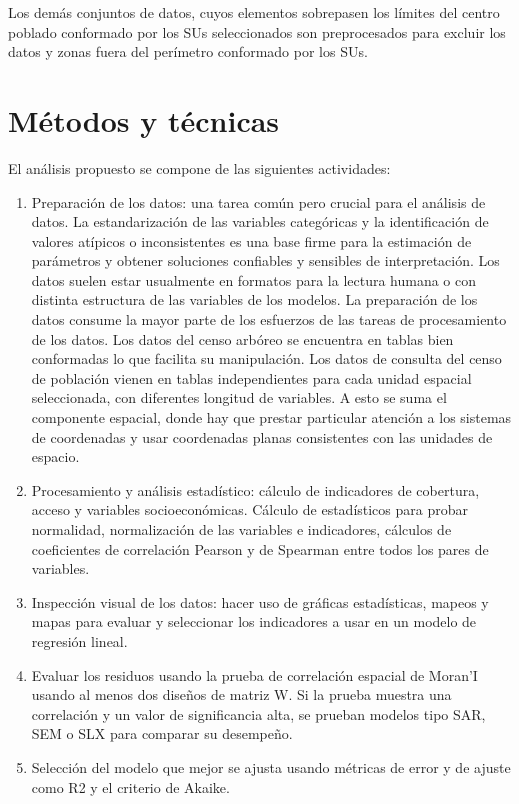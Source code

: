 \documentclass[12pt,]{book}
\providecommand{\tightlist}{%
  \setlength{\itemsep}{0pt}\setlength{\parskip}{0pt}}
\begin{document}
Los demás conjuntos de datos, cuyos elementos sobrepasen los límites del
centro poblado conformado por los SUs seleccionados son preprocesados
para excluir los datos y zonas fuera del perímetro conformado por los
SUs.

\section{Métodos y técnicas}\label{metodos-y-tecnicas}

El análisis propuesto se compone de las siguientes actividades:

\begin{enumerate}
\def\labelenumi{\arabic{enumi}.}
\tightlist
\item
  Preparación de los datos: una tarea común pero crucial para el
  análisis de datos. La estandarización de las variables categóricas y
  la identificación de valores atípicos o inconsistentes es una base
  firme para la estimación de parámetros y obtener soluciones confiables
  y sensibles de interpretación. Los datos suelen estar usualmente en
  formatos para la lectura humana o con distinta estructura de las
  variables de los modelos. La preparación de los datos consume la mayor
  parte de los esfuerzos de las tareas de procesamiento de los datos.
  Los datos del censo arbóreo se encuentra en tablas bien conformadas lo
  que facilita su manipulación. Los datos de consulta del censo de
  población vienen en tablas independientes para cada unidad espacial
  seleccionada, con diferentes longitud de variables. A esto se suma el
  componente espacial, donde hay que prestar particular atención a los
  sistemas de coordenadas y usar coordenadas planas consistentes con las
  unidades de espacio.
\item
  Procesamiento y análisis estadístico: cálculo de indicadores de
  cobertura, acceso y variables socioeconómicas. Cálculo de estadísticos
  para probar normalidad, normalización de las variables e indicadores,
  cálculos de coeficientes de correlación Pearson y de Spearman entre
  todos los pares de variables.
\item
  Inspección visual de los datos: hacer uso de gráficas estadísticas,
  mapeos y mapas para evaluar y seleccionar los indicadores a usar en un
  modelo de regresión lineal.
\item
  Evaluar los residuos usando la prueba de correlación espacial de
  Moran'I usando al menos dos diseños de matriz W. Si la prueba muestra
  una correlación y un valor de significancia alta, se prueban modelos
  tipo SAR, SEM o SLX para comparar su desempeño.
\item
  Selección del modelo que mejor se ajusta usando métricas de error y de
  ajuste como R2 y el criterio de Akaike.
\end{enumerate}
\end{document}
